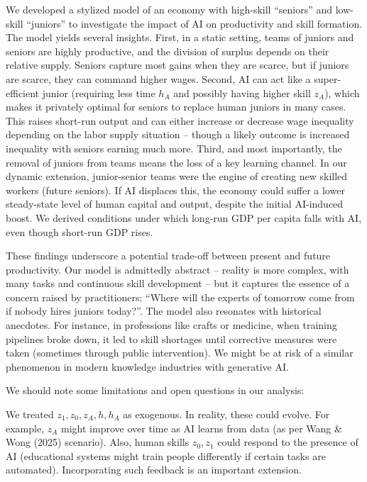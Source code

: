 \documentclass[12pt]{article}
\begin{document}
We developed a stylized model of an economy with high-skill ``seniors''
and low-skill ``juniors'' to investigate the impact of AI on
productivity and skill formation. The model yields several insights.
{First}, in a static setting, teams of juniors and seniors are
highly productive, and the division of surplus depends on their relative
supply. Seniors capture most gains when they are scarce, but if juniors
are scarce, they can command higher wages. {Second}, AI can act
like a super-efficient junior (requiring less time \(h_A\) and possibly
having higher skill \(z_A\)), which makes it privately optimal for
seniors to replace human juniors in many cases. This raises short-run
output and can either increase or decrease wage inequality depending on
the labor supply situation -- though a likely outcome is increased
inequality with seniors earning much more. {Third}, and most
importantly, the removal of juniors from teams means the {loss of
a key learning channel}. In our dynamic extension, junior-senior teams
were the engine of creating new skilled workers (future seniors). If AI
displaces this, the economy could suffer a {lower steady-state
level of human capital and output}, despite the initial AI-induced
boost. We derived conditions under which long-run GDP per capita falls
with AI, even though short-run GDP rises.

These findings underscore a potential {trade-off between present
and future productivity}. Our model is admittedly abstract -- reality is
more complex, with many tasks and continuous skill development -- but it
captures the essence of a concern raised by practitioners: {``Where
will the experts of tomorrow come from if nobody hires juniors
today?''}. The model also resonates with historical anecdotes. For
instance, in professions like crafts or medicine, when training
pipelines broke down, it led to skill shortages until corrective
measures were taken (sometimes through public intervention). We might be
at risk of a similar phenomenon in modern knowledge industries with
generative AI.

We should note some {limitations and open questions} in our
analysis:


We treated \(z_1, z_0, z_A, h, h_A\) as exogenous. In reality, these
could evolve. For example, \(z_A\) might improve over time as AI
learns from data (as per Wang \& Wong (2025) scenario). Also, human
skills \(z_0, z_1\) could respond to the presence of AI (educational
systems might train people differently if certain tasks are
automated). Incorporating such feedback is an important extension.
\end{document}
